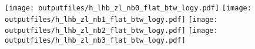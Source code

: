 \documentclass[11pt]{article}
\begin{document}
    \noindent
     \texttt{[image: outputfiles/h\_lhb\_zl\_nb0\_flat\_btw\_logy.pdf]}
     \texttt{[image: outputfiles/h\_lhb\_zl\_nb1\_flat\_btw\_logy.pdf]}
     \texttt{[image: outputfiles/h\_lhb\_zl\_nb2\_flat\_btw\_logy.pdf]}
     \texttt{[image: outputfiles/h\_lhb\_zl\_nb3\_flat\_btw\_logy.pdf]}

   \clearpage







\end{document}
